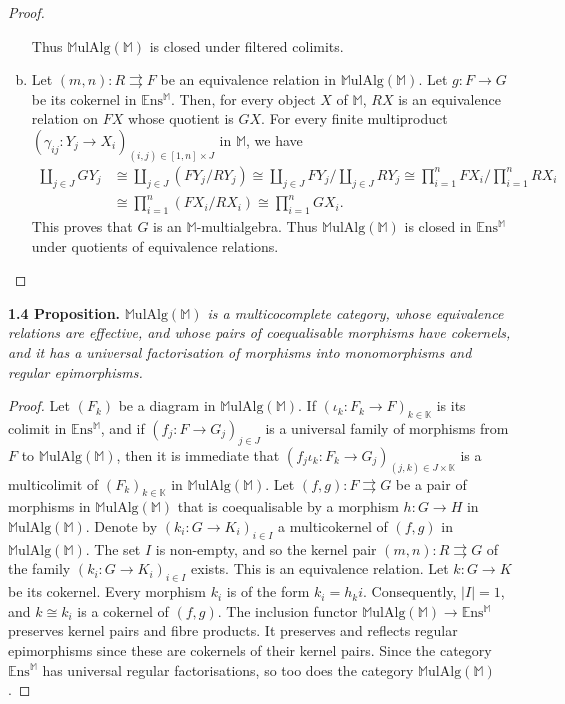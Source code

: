 \documentclass{article}
\newenvironment{itenv}[1]
  {\phantomsection\par\medskip\noindent\textbf{#1.}\itshape}
  {\medskip}
\newcommand{\bb}[1]{{\mathbb{#1}}}
\newcommand{\Set}{\mathbb{E}\mathrm{ns}}
\newcommand{\MulAlg}{\mathbb{M}\mathrm{ulAlg}}
\newcommand{\oldpage}[1]{\marginpar{\footnotesize$\Big\vert$ \textit{p.~#1}}}
\begin{document}
\begin{proof}
\begin{enumerate}[a)]
      Thus $\MulAlg(\bb{M})$ is closed under filtered colimits.
    \item Let $(m,n)\colon R\rightrightarrows F$ be an equivalence relation in $\MulAlg(\bb{M})$.
      Let $g\colon F\to G$ be its cokernel in $\Set^\bb{M}$.
      Then, for every object $X$ of $\bb{M}$, $RX$ is an equivalence relation on $FX$ whose quotient is $GX$.
      For every finite multiproduct $(\gamma_{ij}\colon Y_j\to X_i)_{(i,j)\in[1,n]\times J}$ in $\bb{M}$, we have
      \[
        \begin{aligned}
          \coprod_{j\in J} GY_j
          &\cong \coprod_{j\in J} (FY_j/RY_j)
          \cong \coprod_{j\in J} FY_j \Big/ \coprod_{j\in J} RY_j
          \cong \prod_{i=1}^n FX_i \Big/ \prod_{i=1}^n RX_i
        \\&\cong \prod_{i=1}^n (FX_i/RX_i)
          \cong \prod_{i=1}^n GX_i.
        \end{aligned}
      \]
      This proves that $G$ is an $\bb{M}$-multialgebra.
      Thus $\MulAlg(\bb{M})$ is closed in $\Set^\bb{M}$ under quotients of equivalence relations.
  \end{enumerate}
\end{proof}

\oldpage{199}
\begin{itenv}{1.4 Proposition}
\label{1.4}
  $\MulAlg(\bb{M})$ is a multicocomplete category, whose equivalence relations are effective, and whose pairs of coequalisable morphisms have cokernels, and it has a universal factorisation of morphisms into monomorphisms and regular epimorphisms.
\end{itenv}

\begin{proof}
  Let $(F_k)$ be a diagram in $\MulAlg(\bb{M})$.
  If $(\iota_k\colon F_k\to F)_{k\in\bb{K}}$ is its colimit in $\Set^\bb{M}$, and if $(f_j\colon F\to G_j)_{j\in J}$ is a universal family of morphisms from $F$ to $\MulAlg(\bb{M})$, then it is immediate that $(f_j\iota_k\colon F_k\to G_j)_{(j,k)\in J\times\bb{K}}$ is a multicolimit of $(F_k)_{k\in\bb{K}}$ in $\MulAlg(\bb{M})$.
  Let $(f,g)\colon F\rightrightarrows G$ be a pair of morphisms in $\MulAlg(\bb{M})$ that is coequalisable by a morphism $h\colon G\to H$ in $\MulAlg(\bb{M})$.
  Denote by $(k_i\colon G\to K_i)_{i\in I}$ a multicokernel of $(f,g)$ in $\MulAlg(\bb{M})$.
  The set $I$ is non-empty, and so the kernel pair $(m,n)\colon R\rightrightarrows G$ of the family $(k_i\colon G\to K_i)_{i\in I}$ exists.
  This is an equivalence relation.
  Let $k\colon G\to K$ be its cokernel.
  Every morphism $k_i$ is of the form $k_i=h_ki$.
  Consequently, $|I|=1$, and $k\cong k_i$ is a cokernel of $(f,g)$.
  The inclusion functor $\MulAlg(\bb{M})\to\Set^\bb{M}$ preserves kernel pairs and fibre products.
  It preserves and reflects regular epimorphisms since these are cokernels of their kernel pairs.
  Since the category $\Set^\bb{M}$ has universal regular factorisations, so too does the category $\MulAlg(\bb{M})$.
\end{proof}
\end{document}
